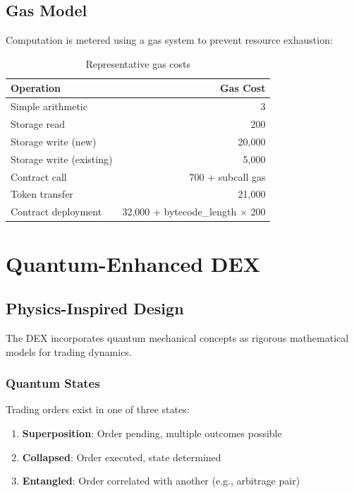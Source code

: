 \documentclass[11pt,a4paper]{article}
\begin{document}
\subsection{Gas Model}

Computation is metered using a gas system to prevent resource exhaustion:

\begin{table}[H]
\centering
\begin{tabular}{lr}
\toprule
\textbf{Operation} & \textbf{Gas Cost} \\
\midrule
Simple arithmetic & 3 \\
Storage read & 200 \\
Storage write (new) & 20,000 \\
Storage write (existing) & 5,000 \\
Contract call & 700 + subcall gas \\
Token transfer & 21,000 \\
Contract deployment & 32,000 + bytecode\_length $\times$ 200 \\
\bottomrule
\end{tabular}
\caption{Representative gas costs}
\end{table}

\section{Quantum-Enhanced DEX}

\subsection{Physics-Inspired Design}

The DEX incorporates quantum mechanical concepts as rigorous mathematical models for trading dynamics.

\subsubsection{Quantum States}

Trading orders exist in one of three states:

\begin{enumerate}[leftmargin=*]
    \item \textbf{Superposition}: Order pending, multiple outcomes possible
    \item \textbf{Collapsed}: Order executed, state determined
    \item \textbf{Entangled}: Order correlated with another (e.g., arbitrage pair)
\end{enumerate}
\end{document}
